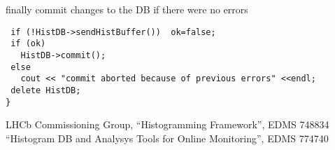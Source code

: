 \documentclass{lhcbnote}
\begin{document}
finally commit changes to the DB if there were no errors
\begin{verbatim}
 if (!HistDB->sendHistBuffer())  ok=false;
 if (ok) 
   HistDB->commit();
 else 
   cout << "commit aborted because of previous errors" <<endl;
 delete HistDB;
}
\end{verbatim}


\begin{thebibliography}{99}
LHCb Commissioning Group, ``Histogramming Framework'', EDMS 748834
``Histogram DB and Analysys Tools for Online Monitoring'', EDMS 774740

\end{thebibliography}
\end{document}
